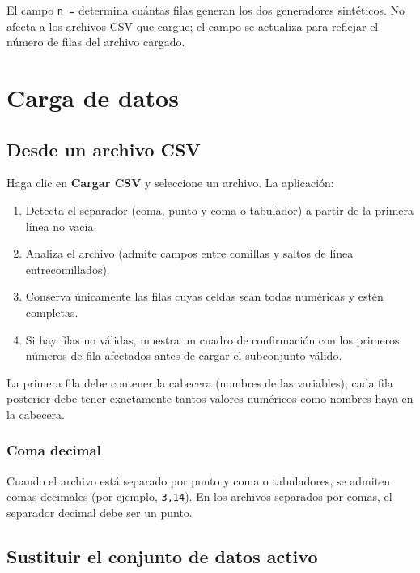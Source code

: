 \documentclass[11pt,a4paper]{article}
\begin{document}
\begin{notebox}
El campo \texttt{n =} determina cuántas filas generan los dos generadores sintéticos. No afecta a los archivos CSV que cargue; el campo se actualiza para reflejar el número de filas del archivo cargado.
\end{notebox}

\section{Carga de datos}

\subsection{Desde un archivo CSV}

Haga clic en \textbf{Cargar CSV} y seleccione un archivo. La aplicación:

\begin{enumerate}[leftmargin=1.4em]
  \item Detecta el separador (coma, punto y coma o tabulador) a partir de la primera línea no vacía.
  \item Analiza el archivo (admite campos entre comillas y saltos de línea entrecomillados).
  \item Conserva únicamente las filas cuyas celdas sean todas numéricas y estén completas.
  \item Si hay filas no válidas, muestra un cuadro de confirmación con los primeros números de fila afectados antes de cargar el subconjunto válido.
\end{enumerate}

La primera fila debe contener la cabecera (nombres de las variables); cada fila posterior debe tener exactamente tantos valores numéricos como nombres haya en la cabecera.

\subsubsection*{Coma decimal}

Cuando el archivo está separado por punto y coma o tabuladores, se admiten comas decimales (por ejemplo, \texttt{3,14}). En los archivos separados por comas, el separador decimal debe ser un punto.

\subsection{Sustituir el conjunto de datos activo}
\end{document}
